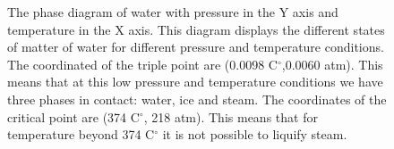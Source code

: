 \documentclass[main.tex]{subfiles}
\begin{document}
\begin{figure}
\caption{The phase diagram of water with pressure in the Y axis and temperature in the X axis. This diagram displays the different states of matter of water for different pressure and temperature conditions. The coordinated of the triple point are (0.0098 C$^{\circ}$,0.0060 atm). This means that at this low pressure and temperature conditions we have three phases in contact: water, ice and steam. The coordinates of the critical point are (374 C$^{\circ}$, 218 atm). This means that for temperature beyond 374 C$^{\circ}$ it is not possible to liquify steam.}

\forceversofloat

\end{figure}%
\end{document}
